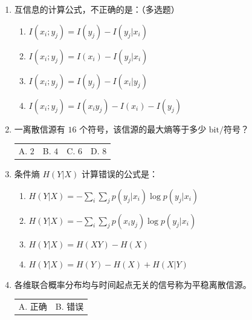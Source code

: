 \documentclass[UTF8,a4paper,12pt]{ctexart}
\begin{document}
\begin{enumerate}[label=\arabic*., leftmargin=2em, itemsep=1.4em]
\begin{enumerate}[label=\Alph*. , leftmargin=2em, itemsep=0.4em]
\item 大于等于，大于，小于
\item 等于，小于等于，等于
\item 小于，等于，大于
\item 小于等于，大于，等于
\end{enumerate}

\item 互信息的计算公式，不正确的是：（多选题）

\begin{enumerate}[label=\Alph*. , leftmargin=2em, itemsep=0.4em]
\item $I(x_i;y_j)=I(y_j)-I(y_j|x_i)$
\item $I(x_i;y_j)=I(x_i)-I(y_j|x_i)$
\item $I(x_i;y_j)=I(y_j)-I(x_i|y_j)$
\item $I(x_i;y_j)=I(x_iy_j)-I(x_i)-I(y_j)$
\end{enumerate}

\item 一离散信源有 $16$ 个符号，该信源的最大熵等于多少 $\mathrm{bit/}$符号？

\begin{tabular}{@{}p{}p{}p{}p{}@{}}
A. $2$ & B. $4$ & C. $6$ & D. $8$
\end{tabular}

\item 条件熵 $H(Y|X)$ 计算错误的公式是：

\begin{enumerate}[label=\Alph*. , leftmargin=2em, itemsep=0.4em]
\item $\displaystyle H(Y|X)=-\sum_i\sum_j p(y_j|x_i)\log p(y_j|x_i)$

\item $\displaystyle H(Y|X)=-\sum_i\sum_j p(x_i y_j)\log p(y_j|x_i)$

\item $\displaystyle H(Y|X)=H(XY)-H(X)$

\item $\displaystyle H(Y|X)=H(Y)-H(X)+H(X|Y)$
\end{enumerate}

\item 各维联合概率分布均与时间起点无关的信号称为平稳离散信源。

\begin{tabular}{@{}p{}p{}@{}}
A. 正确 & B. 错误
\end{tabular}


\end{enumerate}
\end{document}
